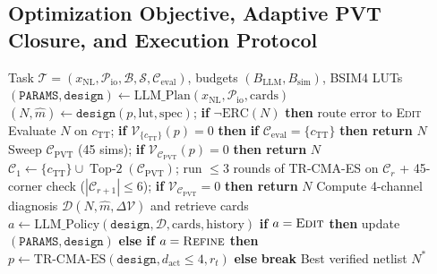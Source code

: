 \documentclass{article}
\theoremstyle{plain}
\begin{document}
\subsection{Optimization Objective, Adaptive PVT Closure, and Execution Protocol}
\begin{algorithm}[t]
\caption{\textsc{SPECTRA}: Closed-Loop Intent Synthesis}
\label{alg:spectra}
\footnotesize
\begin{algorithmic}[1]
\REQUIRE Task $\mathcal{T} = (x_{\text{NL}}, \mathcal{P}_{\text{io}}, \mathcal{B}, \mathcal{S}, \mathcal{C}_{\text{eval}})$, budgets $(B_{\text{LLM}}, B_{\text{sim}})$, BSIM4 LUTs
\STATE $(\texttt{PARAMS}, \texttt{design}) \gets \text{LLM\_Plan}(x_{\text{NL}}, \mathcal{P}_{\text{io}}, \text{cards})$
  \STATE $(N, \hat{m}) \gets \texttt{design}(p, \text{lut}, \text{spec})$; \textbf{if} $\neg\text{ERC}(N)$ \textbf{then} route error to \textsc{Edit}
  \STATE Evaluate $N$ on $c_{\text{TT}}$; \textbf{if} $\mathcal{V}_{\{c_{\text{TT}}\}}(p) = 0$ \textbf{then}
  \STATE \quad \textbf{if} $\mathcal{C}_{\text{eval}} = \{c_{\text{TT}}\}$ \textbf{then return} $N$
  \STATE \quad Sweep $\mathcal{C}_{\text{PVT}}$ (45 sims); \textbf{if} $\mathcal{V}_{\mathcal{C}_{\text{PVT}}}(p) = 0$ \textbf{then return} $N$
  \STATE \quad $\mathcal{C}_1 \gets \{c_{\text{TT}}\} \cup \operatorname{Top-2}(\mathcal{C}_{\text{PVT}})$; run $\le 3$ rounds of TR-CMA-ES on $\mathcal{C}_r$ + 45-corner check ($|\mathcal{C}_{r+1}| \le 6$); \textbf{if} $\mathcal{V}_{\mathcal{C}_{\text{PVT}}} = 0$ \textbf{then return} $N$
  \STATE Compute 4-channel diagnosis $\mathcal{D}(N, \hat{m}, \Delta \mathcal{V})$ and retrieve cards
  \STATE $a \gets \text{LLM\_Policy}(\texttt{design}, \mathcal{D}, \text{cards}, \text{history})$
  \STATE \textbf{if} $a = \textsc{Edit}$ \textbf{then} update $(\texttt{PARAMS}, \texttt{design})$
  \STATE \textbf{else if} $a = \textsc{Refine}$ \textbf{then} $p \gets \text{TR-CMA-ES}(\texttt{design}, d_{\text{act}} \le 4, r_t)$
  \STATE \textbf{else} \textbf{break} 
\ENDWHILE
\RETURN Best verified netlist $N^*$
\end{algorithmic}
\end{algorithm}
\end{document}
